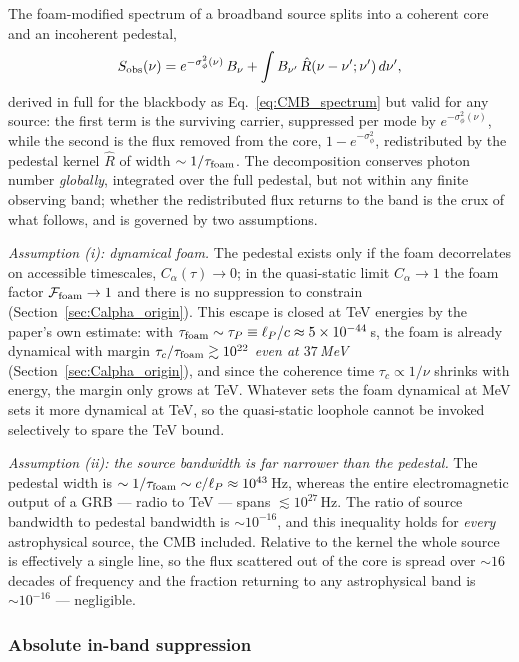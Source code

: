 \documentclass[aps,prd,onecolumn,amsmath,amssymb]{revtex4-2}
\begin{document}
The foam-modified spectrum of a broadband source splits into a coherent
core and an incoherent pedestal,
\begin{equation}
  S_{\rm obs}(\nu)
    = e^{-\sigma_\phi^2(\nu)}\,B_\nu
    + \int B_{\nu'}\,\hat{R}(\nu-\nu';\nu')\,d\nu',
  \label{eq:robs_decomp}
\end{equation}
derived in full for the blackbody as Eq.~\eqref{eq:CMB_spectrum} but
valid for any source: the first term is the surviving carrier,
suppressed per mode by $e^{-\sigma_\phi^2(\nu)}$, while the second is the
flux removed from the core, $1-e^{-\sigma_\phi^2}$, redistributed by the
pedestal kernel $\hat{R}$ of width $\sim1/\tau_{\rm foam}$.  The
decomposition conserves photon number \emph{globally}, integrated over
the full pedestal, but not within any finite observing band; whether the
redistributed flux returns to the band is the crux of what follows, and
is governed by two assumptions.

\emph{Assumption (i): dynamical foam.}  The pedestal exists only if the
foam decorrelates on accessible timescales, $C_\alpha(\tau)\to0$;
in the quasi-static limit $C_\alpha\to1$ the foam factor
$\mathcal{F}_{\rm foam}\to1$ and there is no suppression to constrain
(Section~\ref{sec:Calpha_origin}).  This escape is closed at TeV
energies by the paper's own estimate: with
$\tau_{\rm foam}\sim\tau_P\equiv\ell_P/c\approx5\times10^{-44}$\,s, the
foam is already dynamical with margin $\tau_c/\tau_{\rm foam}\gtrsim10^{22}$
\emph{even at $37$\,MeV} (Section~\ref{sec:Calpha_origin}), and since the
coherence time $\tau_c\propto1/\nu$ shrinks with energy, the margin only
grows at TeV.  Whatever sets the foam dynamical at MeV sets it more
dynamical at TeV, so the quasi-static loophole cannot be invoked
selectively to spare the TeV bound.

\emph{Assumption (ii): the source bandwidth is far narrower than the
pedestal.}  The pedestal width is
$\sim1/\tau_{\rm foam}\sim c/\ell_P\approx10^{43}$\,Hz, whereas the
entire electromagnetic output of a GRB --- radio to TeV --- spans
$\lesssim10^{27}$\,Hz.  The ratio of source bandwidth to pedestal
bandwidth is $\sim10^{-16}$, and this inequality holds for \emph{every}
astrophysical source, the CMB included.  Relative to the kernel the
whole source is effectively a single line, so the flux scattered out of
the core is spread over $\sim16$ decades of frequency and the fraction
returning to any astrophysical band is $\sim10^{-16}$ ---
negligible.

\subsubsection{Absolute in-band suppression}
\label{sec:grb_absolute}
\end{document}
